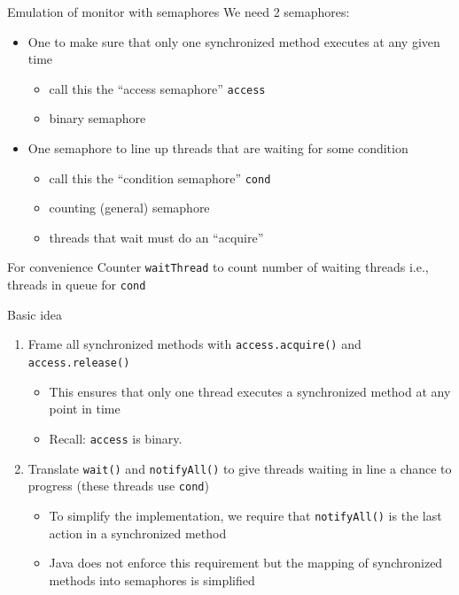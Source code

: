 \begin{frame}{Emulation of monitor with semaphores}
  We need 2 semaphores:
  \begin{itemize}
  \item	One to make sure that only one synchronized method executes at any given time
    \begin{itemize}
    \item call this the ``access semaphore'' \lstinline!access!
    \item binary semaphore
    \end{itemize}
  \item One semaphore to line up threads that are waiting for some condition
    \begin{itemize}
    \item call this the ``condition semaphore'' \lstinline!cond!
    \item counting (general) semaphore
    \item threads that wait must do an ``acquire''
    \end{itemize}
  \end{itemize}


  \begin{block}{For convenience}
    Counter \lstinline!waitThread! to count number of waiting threads
    i.e., threads in queue for \lstinline!cond!
  \end{block}
\end{frame}

\begin{frame}{Basic idea}
  \begin{enumerate}
  \item Frame all synchronized methods with \lstinline!access.acquire()! and
    \lstinline!access.release()!
    \begin{itemize}
    \item This ensures that only one thread executes a synchronized
      method at any point in time
    \item Recall: \lstinline!access! is binary.
    \end{itemize}
  \item Translate \lstinline!wait()! and \lstinline!notifyAll()! to give threads waiting in
    line a chance to progress (these threads use \lstinline!cond!)
    \begin{itemize}
    \item To simplify the implementation, we require that
      \lstinline!notifyAll()! is the last action in a synchronized
      method
    \item Java does not enforce this requirement but the mapping of
      synchronized methods into semaphores is simplified
    \end{itemize}
  \end{enumerate}
\end{frame}

